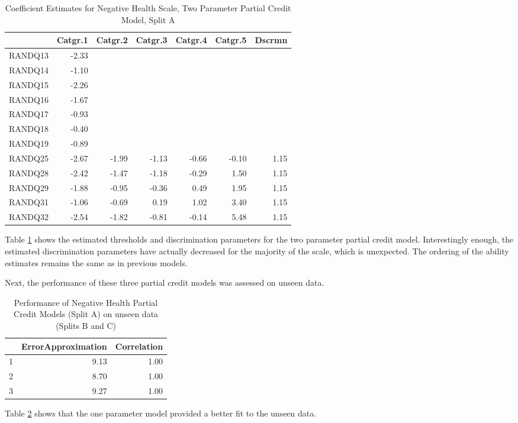 \documentclass{article}
\begin{document}
\begin{table}[ht]
\centering
\begin{tabular}{rrrrrrr}
  \hline
 & Catgr.1 & Catgr.2 & Catgr.3 & Catgr.4 & Catgr.5 & Dscrmn \\ 
  \hline
RANDQ13 & -2.33 &  &  &  &  &  \\ 
  RANDQ14 & -1.10 &  &  &  &  &  \\ 
  RANDQ15 & -2.26 &  &  &  &  &  \\ 
  RANDQ16 & -1.67 &  &  &  &  &  \\ 
  RANDQ17 & -0.93 &  &  &  &  &  \\ 
  RANDQ18 & -0.40 &  &  &  &  &  \\ 
  RANDQ19 & -0.89 &  &  &  &  &  \\ 
  RANDQ25 & -2.67 & -1.99 & -1.13 & -0.66 & -0.10 & 1.15 \\ 
  RANDQ28 & -2.42 & -1.47 & -1.18 & -0.29 & 1.50 & 1.15 \\ 
  RANDQ29 & -1.88 & -0.95 & -0.36 & 0.49 & 1.95 & 1.15 \\ 
  RANDQ31 & -1.06 & -0.69 & 0.19 & 1.02 & 3.40 & 1.15 \\ 
  RANDQ32 & -2.54 & -1.82 & -0.81 & -0.14 & 5.48 & 1.15 \\ 
   \hline
\end{tabular}
\caption{Coefficient Estimates for Negative Health Scale, Two Parameter Partial Credit Model, Split A} 
\label{tab:neghealth2apcm2pl}
\end{table}
Table \ref{tab:neghealth2apcm2pl} shows the estimated thresholds and discrimination parameters for the two parameter partial credit model. Interestingly enough, the estimated discrimination parameters have actually decreased for the majority of the scale, which is unexpected. The ordering of the ability estimates remains the same as in previous models. 

Next, the performance of these three partial credit models was assessed on unseen data. 

\begin{table}[ht]
\centering
\begin{tabular}{rrr}
  \hline
 & ErrorApproximation & Correlation \\ 
  \hline
1 & 9.13 & 1.00 \\ 
  2 & 8.70 & 1.00 \\ 
  3 & 9.27 & 1.00 \\ 
   \hline
\end{tabular}
\caption{Performance of Negative Health Partial Credit Models (Split A) on unseen data (Splits B and C)} 
\label{tab:neghealth2apcmtest}
\end{table}
Table \ref{tab:neghealth2apcmtest} shows that the one parameter model provided a better fit to the unseen data. 
\end{document}
